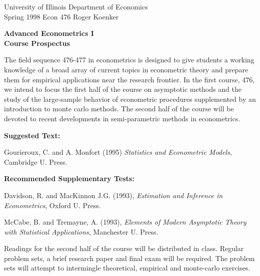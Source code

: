 \setlength{\textwidth}{170mm}
\setlength{\textheight}{220mm}
\setlength{\oddsidemargin}{0mm}
\setlength{\evensidemargin}{10mm}
\setlength{\topmargin}{-10mm}
\def\RR{\hbox{\raise.4ex\hbox{$\scriptstyle{|}$}\hskip-1.85pt R}}
\newcommand{\REF}{\nopagebreak\noindent{\large{\bf
      References}}\vspace{.2in}}

\newcommand{\Ref}[1]{\medskip\noindent\hangafter=1
      \hangindent=20pt\ignorespaces #1}
\pagestyle{empty}



\noindent
University of Illinois \hfill Department of Economics \\
Spring 1998 \hfill Econ 476 \hfill Roger Koenker

\begin{center}
\large{
{\bf Advanced Econometrics I \\
\vspace{2mm}
Course Prospectus}}
\end{center}

\vspace{10mm}
The field sequence 476-477 in econometrics is designed to give students a 
working knowledge of a broad array of current topics in econometric theory and 
prepare them for empirical applications near the research frontier.  In the 
first course, 476, we intend to focus the first half of the course on 
asymptotic methods and the study of the large-sample behavior of econometric 
procedures supplemented by an introduction to monte carlo 
methods.  The second half of the course will be devoted to recent developments 
in semi-parametric methods in econometrics.

\vspace{5mm}
\noindent
{\bf Suggested Text:}

Gourieroux, C. and A. Monfort (1995) 
{\it Statistics and Econometric Models}, Cambridge U. Press.

\vspace{5mm}
\noindent
{\bf Recommended Supplementary Tests:}

Davidson, R. and MacKinnon J.G. (1993), {\em Estimation and Inference in 
Econometrics}, Oxford U. Press.

McCabe, B. and Tremayne, A. (1993), {\em Elements of Modern Asymptotic 
Theory with Statistical Applications}, Manchester U. Press.

\vspace{5mm}
\noindent
Readings for the second half of the course will be distributed in class.
Regular problem sets, a brief research paper and final exam will be 
required.  The problem sets will attempt to intermingle theoretical, 
empirical and monte-carlo exercises.

